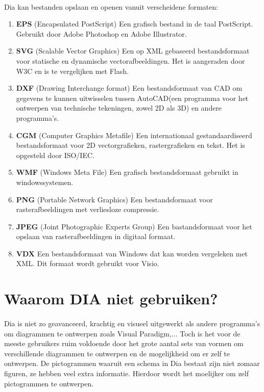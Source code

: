 \documentclass[12pt,a4paper]{report}
\begin{document}
\begin{flushleft}
\paragraph*{}
Dia kan bestanden opslaan en openen vanuit verscheidene formaten:
\begin{enumerate}
\item \textbf{EPS} (Encapsulated PostScript) Een grafisch bestand in de taal PostScript. Gebruikt door Adobe Photoshop en Adobe Illustrator.
\item \textbf{SVG} (Scalable Vector Graphics) Een op XML gebaseerd bestandsformaat voor statische en dynamische vectorafbeeldingen. Het is aangeraden door W3C en is te vergelijken met Flash.
\item \textbf{DXF} (Drawing Interchange format) Een bestandsformaat van CAD om gegevens te kunnen uitwisselen tussen AutoCAD(een programma voor het ontwerpen van technische tekeningen, zowel 2D als 3D) en andere programma's.
\item \textbf{CGM} (Computer Graphics Metafile) Een internationaal gestandaardiseerd bestandsformaat voor 2D vectorgrafieken, rastergrafieken en tekst. Het is opgesteld door ISO/IEC.
\item \textbf{WMF} (Windows Meta File) Een grafisch bestandsformaat gebruikt in windowssystemen.
\item \textbf{PNG} (Portable Network Graphics) Een bestandsformaat voor rasterafbeeldingen met verliesloze compressie. 
\item \textbf{JPEG} (Joint Photographic Experts Group) Een bastandsformaat voor het opslaan van rasterafbeeldingen in digitaal formaat.
\item \textbf{VDX} Een bestandsformaat van Windows dat kan worden vergeleken met XML. Dit formaat wordt gebruikt voor Visio.
\end{enumerate}
\section{Waarom DIA niet gebruiken?}
\paragraph*{}
Dia is niet zo geavanceerd, krachtig en visueel uitgewerkt als andere programma's om diagrammen te ontwerpen zoals Visual Paradigm,... Toch is het voor de meeste gebruikers ruim voldoende door het grote aantal sets van vormen om verschillende diagrammen te ontwerpen en de mogelijkheid om er zelf te ontwerpen. De pictogrammen waaruit een schema in Dia bestaat zijn niet zomaar figuren, ze hebben veel extra informatie. Hierdoor wordt het moelijker om zelf pictogrammen te ontwerpen. 

\end{flushleft}
\end{document}
